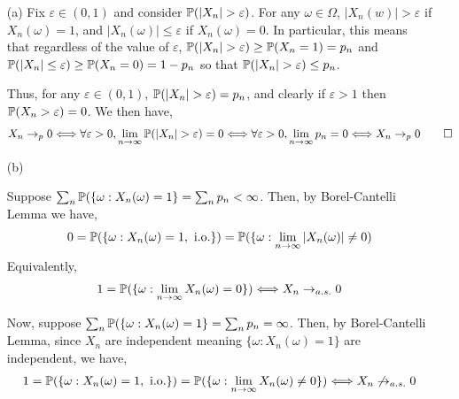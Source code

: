 \documentclass[10pt]{article}
\begin{document}
\begin{solution}

\begin{enumerate}
    \item[(a)] 
        Fix \( \varepsilon \in(0,1) \) and consider \( \mathbb{P}(|X_n| > \varepsilon) \). For any \( \omega\in \Omega \), \( |X_n(w)|  > \varepsilon \) if \( X_n(\omega) = 1 \), and \( |X_n(\omega)| \leq \varepsilon \) if \( X_n(\omega)=0 \). In particular, this means that regardless of the value of \( \varepsilon \), \( \mathbb{P}(|X_n| > \varepsilon) \geq \mathbb{P}(X_n=1) = p_n \) and \( \mathbb{P}(|X_n| \leq \varepsilon) \geq \mathbb{P}(X_n=0) = 1-p_n \) so that \( \PP(|X_n|>\varepsilon) \leq p_n \).

         Thus, for any \( \varepsilon \in(0,1) \), \( \mathbb{P}( |X_n| > \varepsilon ) = p_n \), and clearly if \( \varepsilon > 1 \) then \( \mathbb{P}(X_n > \varepsilon) = 0 \). We then have,
        \begin{align*}
            X_n\to_{p}0 
            \Longleftrightarrow \forall \varepsilon>0, \lim_{n\to\infty} \PP(|X_n|>\varepsilon) = 0 
            \Longleftrightarrow \forall \varepsilon>0, \lim_{n\to\infty} p_n = 0
            \Longleftrightarrow X_n\to_{p} 0 \tag*{\qed}
        \end{align*}


    \item[(b)]



         Suppose \( \sum_n \mathbb{P}(\{\omega : X_n(\omega)=1\} = \sum_n p_n < \infty \). Then, by Borel-Cantelli Lemma we have,
        \begin{align*}
            0 = \mathbb{P}(\{\omega: X_n(\omega) = 1, \text{ i.o.}\}) = \mathbb{P}(\{\omega: \lim_{n\to\infty} |X_n(\omega)|\neq 0)
        \end{align*}
        Equivalently,
        \begin{align*}
            1 = \mathbb{P}(\{\omega : \lim_{n\to\infty} X_n(\omega)=0\}) 
            \Longleftrightarrow X_n\to_{a.s.}0
        \end{align*}


        Now, suppose \( \sum_n \mathbb{P}(\{\omega : X_n(\omega)=1\} = \sum_n p_n = \infty \). Then, by Borel-Cantelli Lemma, since \( X_n \) are independent meaning \( \{\omega:X_n(\omega)=1\} \) are independent, we have,
        \begin{align*}
            1 = \mathbb{P}(\{\omega: X_n(\omega) = 1, \text{ i.o.}\})
              = \mathbb{P}(\{\omega : \lim_{n\to\infty} X_n(\omega)\neq0\}) 
            \Longleftrightarrow X_n \not\to_{a.s.}0
        \end{align*}


\end{enumerate}
\end{solution}
\end{document}
